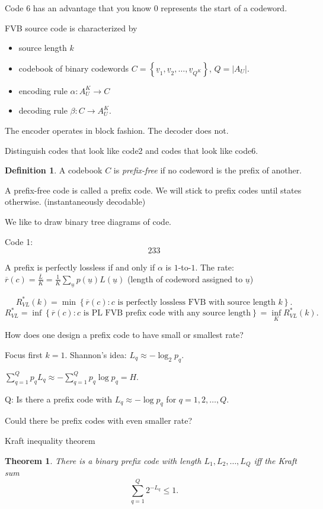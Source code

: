 \documentclass{report}
\newcommand{\set}[1]{\left\lbrace #1 \right\rbrace}
\newtheorem{theorem}{Theorem}[section]
\theoremstyle{definition}
\newtheorem{definition}{Definition}[section]
\theoremstyle{remark}
\numberwithin{equation}{section}
\begin{document}
Code 6 has an advantage that you know 0 represents the start of a codeword.

FVB source code is characterized by \begin{itemize}
  \item source length $k$
  \item codebook of binary codewords $C = \set{\underline{v}_1, \underline{v}_2, \ldots, \underline{v}_{Q^K}}$, $Q = |A_U|$.
  \item encoding rule $\alpha: A_U^K \to C$
  \item decoding rule $\beta: C \to A_U^K$.
\end{itemize}

The encoder operates in block fashion. The decoder does not.

Distinguish codes that look like code2 and codes that look like code6.

\begin{definition}
  A codebook $C$ is \emph{prefix-free} if no codeword is the prefix of another. 
\end{definition}
A prefix-free code is called a prefix code. We will stick to prefix codes until states otherwise.
(instantaneously decodable)

We like to draw binary tree diagrams of code.

Code 1: \[
  233
\]

A prefix is perfectly lossless if and only if $\alpha$ is $1$-to-$1$.
The rate: $\overline{r}(c) = \frac{\overline{L}}{K} = \frac{1}{K}\sum_{\underline{u}}p(\underline{u})L(\underline{u})$ (length of codeword assigned to $\underline{u}$)

\[
  R^*_{VL}(k) = \min \set{\overline{r}(c): c \text{ is perfectly lossless FVB with source length $k$}}.
\]
\[
  R^*_{VL} = \inf \set{\overline{r}(c): c \text{ is PL FVB prefix code with any source length}} = \inf_K R^*_{VL}(k).
\]

How does one design a prefix code to have small or smallest rate?

Focus first $k = 1$. Shannon's idea: $L_q \approx -\log_2 p_q$.

$\sum_{q=1}^Q p_q L_q \approx -\sum_{q=1}^Q p_q \log p_q = H$.

Q: Is there a prefix code with $L_q \approx -\log p_q$ for $q = 1, 2, \ldots, Q$.

Could there be prefix codes with even smaller rate?

Kraft inequality theorem 
\begin{theorem}
  There is a binary prefix code with length $L_1, L_2, \ldots, L_Q$ iff the Kraft sum \[\sum_{q=1}^Q 2^{-L_q} \leq 1.\]
\end{theorem}
\end{document}
